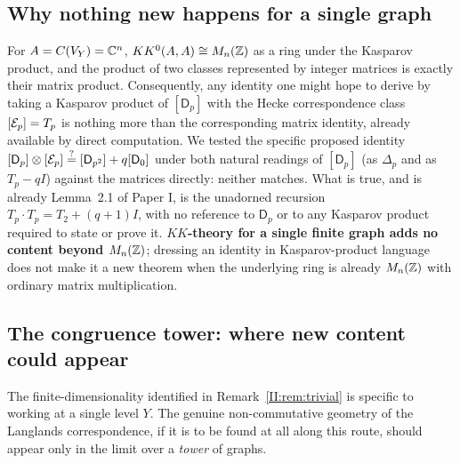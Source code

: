 \subsection{Why nothing new happens for a single graph}

\begin{remark}\label{II:rem:trivial}
For $A=C(V_Y)=\mathbb{C}^n$, $KK^0(A,A)\cong M_n(\mathbb{Z})$ as a ring under the Kasparov product, and
the product of two classes represented by integer matrices is exactly their matrix
product. Consequently, any identity one might hope to derive by taking a Kasparov
product of $[\mathsf D_p]$ with the Hecke correspondence class $[\mathcal{E}_p]=T_p$ is nothing
more than the corresponding matrix identity, already available by direct computation. We
tested the specific proposed identity $[\mathsf D_p]\otimes[\mathcal{E}_p]\overset{?}{=}
[\mathsf D_{p^2}]+q[\mathsf D_0]$ under both natural readings of $[\mathsf D_p]$ (as
$\Delta_p$ and as $T_p-qI$) against the matrices directly: neither matches. What is true,
and is already Lemma~2.1 of Paper I, is the unadorned recursion
$T_p\cdot T_p=T_2+(q+1)I$, with no reference to $\mathsf D_p$ or to any Kasparov product
required to state or prove it. \textbf{$KK$-theory for a single finite graph adds no
content beyond $M_n(\mathbb{Z})$}; dressing an identity in Kasparov-product language does not
make it a new theorem when the underlying ring is already $M_n(\mathbb{Z})$ with ordinary matrix
multiplication.
\end{remark}

\subsection{The congruence tower: where new content could appear}\label{II:subsec:tower}

The finite-dimensionality identified in Remark~\ref{II:rem:trivial} is specific to working
at a single level $Y$. The genuine non-commutative geometry of the Langlands
correspondence, if it is to be found at all along this route, should appear only in the
limit over a \emph{tower} of graphs.

